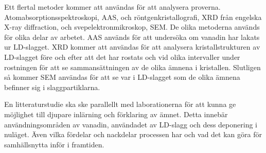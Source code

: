 Ett flertal metoder kommer att användas för att analysera proverna. Atomabsorptionsspektroskopi, AAS, och röntgenkristallografi, XRD från engelska X-ray diffraction, och svepelektronmikroskop, SEM. De olika metoderna används för olika delar av arbetet. AAS används för att undersöka om vanadin har lakats ur LD-slagget. XRD kommer att användas för att analysera kristallstrukturen av LD-slagget före och efter att det har rostats och vid olika intervaller under rostningen för att se sammansättningen av de olika ämnena i kristallen. Slutligen så kommer SEM användas för att se var i LD-slagget som de olika ämnena befinner sig i slaggpartiklarna. 

En litteraturstudie ska ske parallellt med laborationerna för att kunna ge möjlighet till djupare inlärning och förklaring av ämnet. Detta innebär användningsområden av vanadin, användadet av LD-slagg och dess deponering i nuläget. Även vilka fördelar och nackdelar processen har och vad det kan göra för samhällsnytta inför i framtiden. 